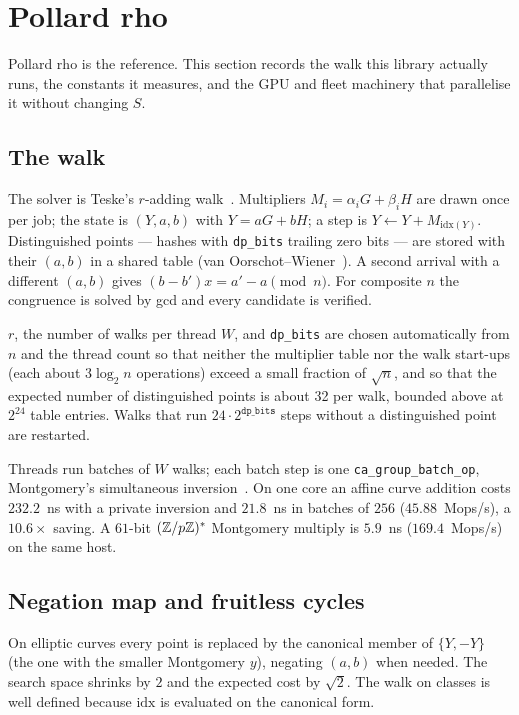 \section{Pollard rho}
\label{sec:rho}

Pollard rho is the reference. This section records the walk this
library actually runs, the constants it measures, and the GPU and
fleet machinery that parallelise it without changing $S$.

\subsection{The walk}
\label{sec:rho-walk}

The solver is Teske's $r$-adding walk~\cite{teske2001}. Multipliers
$M_i=\alpha_i G+\beta_i H$ are drawn once per job; the state is
$(Y,a,b)$ with $Y=aG+bH$; a step is $Y\leftarrow Y+M_{\mathrm{idx}(Y)}$.
Distinguished points --- hashes with \texttt{dp\_bits} trailing zero
bits --- are stored with their $(a,b)$ in a shared table (van
Oorschot--Wiener~\cite{vanoorschot1999}). A second arrival with a
different $(a,b)$ gives $(b-b')x=a'-a\pmod n$. For composite $n$ the
congruence is solved by gcd and every candidate is
verified.

$r$, the number of walks per thread $W$, and \texttt{dp\_bits} are
chosen automatically from $n$ and the thread count so that neither the
multiplier table nor the walk start-ups (each about $3\log_2 n$
operations) exceed a small fraction of $\sqrt{n}$, and so that the
expected number of distinguished points is about 32 per walk, bounded
above at $2^{24}$ table entries. Walks that run $24\cdot
2^{\texttt{dp\_bits}}$ steps without a distinguished point are
restarted.

Threads run batches of $W$ walks; each batch step is one
\texttt{ca\_group\_batch\_op}, Montgomery's simultaneous
inversion~\cite{montgomery1987}. On one core an affine curve addition
costs $232.2$~ns with a private inversion and $21.8$~ns in batches of
$256$ ($45.88$~Mops/s), a $10.6\times$
saving. A
$61$-bit $(\mathbb{Z}/p\mathbb{Z})^*$ Montgomery multiply is $5.9$~ns
($169.4$~Mops/s) on the same host.

\subsection{Negation map and fruitless cycles}

On elliptic curves every point is replaced by the canonical member of
$\{Y,-Y\}$ (the one with the smaller Montgomery $y$), negating $(a,b)$
when needed. The search space shrinks by $2$ and the expected cost by
$\sqrt{2}$. The walk on classes is well defined because $\mathrm{idx}$
is evaluated on the canonical form.

